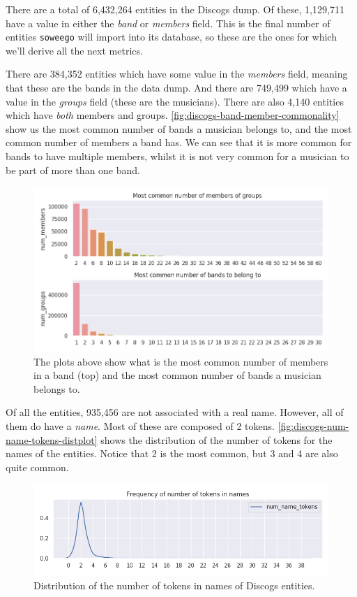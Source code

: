 \documentclass[epsfig,a4paper,11pt,titlepage,twoside,openany]{book}
\begin{document}
There are a total of 6,432,264 entities in the Discogs dump. Of these, 1,129,711 have a value in either the \textit{band} or \textit{members} field. This is the final number of entities \texttt{soweego} will import into its database, so these are the ones for which we'll derive all the next metrics.

There are 384,352 entities which have some value in the \textit{members} field, meaning that these are the bands in the data dump. And there are 749,499 which have a value in the \textit{groups} field (these are the musicians). There are also 4,140 entities which have \textit{both} members and groups. \autoref{fig:discogs-band-member-commonality} show us the most common number of bands a musician belongs to, and the most common number of members a band has. We can see that it is more common for bands to have multiple members, whilst it is not very common for a musician to be part of more than one band.

\begin{figure}[]
  \centering \includegraphics[width=\textwidth]{discogs_band_belonging_barplots} 
  \caption{The plots above show what is the most common number of members in a band (top) and the most common number of bands a musician belongs to.}
  \label{fig:discogs-band-member-commonality}
\end{figure}


Of all the entities, 935,456 are not associated with a real name. However, all of them do have a \textit{name}. Most of these are composed of 2 tokens. \autoref{fig:discogs-num-name-tokens-distplot} shows the distribution of the number of tokens for the names of the entities. Notice that 2 is the most common, but 3 and 4 are also quite common.

\begin{figure}[]
  \centering \includegraphics[width=\textwidth]{discogs_distribution_num_name_tokens} 
  \caption{Distribution of the number of tokens in names of Discogs entities.}
  \label{fig:discogs-num-name-tokens-distplot}
\end{figure}
\end{document}
